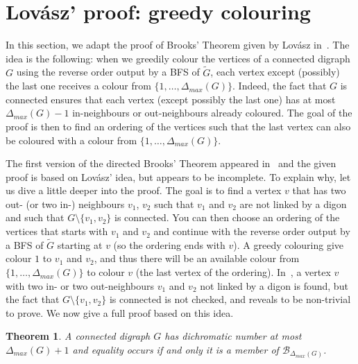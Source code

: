 \documentclass[11pt]{article}
\newtheorem{theorem}[lemma]{Theorem}
\newcommand{\mc}{\mathcal}
\newcommand{\sm}{\setminus}
\newcommand{\dmax}{\Delta_{max}}
\begin{document}



\section{Lov\'asz' proof: greedy colouring}\label{sec:lovasz}

In this section, we adapt the proof of Brooks' Theorem given by Lov\'asz in~\cite{L75}. 
The idea is the following: when we greedily colour the vertices of a connected digraph $G$ using the reverse order output by a BFS of $\tilde G$, each vertex except (possibly) the last one receives a colour from $\{1, \dots, \Delta_{max}(G)\}$. Indeed, the fact that $G$ is connected ensures that each vertex (except possibly the last one) has at most $\dmax(G) -1$ in-neighbours or out-neighbours already coloured. 
The goal of the proof is then to find an ordering of the vertices such that the last vertex can also be coloured with a colour from $\{1, \dots, \Delta_{max}(G)\}$. 

The first version of the directed Brooks' Theorem appeared in~\cite{M10} and the  given proof is based on Lov\'asz' idea, but appears to be incomplete.  
To explain why, let us dive a little deeper into the proof. 
The goal is to find a vertex $v$ that has two out- (or two in-) neighbours $v_1$, $v_2$ such that $v_1$ and $v_2$ are not linked by a digon and such that $G \sm \{v_1, v_2\}$ is connected. 
You can then choose an ordering of the vertices that starts with $v_1$ and $v_2$ and continue with the reverse order output by a BFS of $\tilde G$ starting at $v$ (so the ordering ends with $v$). A greedy colouring give colour $1$ to $v_1$ and $v_2$, and thus there will be an available colour from $\{1, \dots, \dmax(G)\}$ to colour $v$ (the last vertex of the ordering). 
In~\cite{M10}, a vertex $v$ with two in- or two out-neighbours $v_1$ and $v_2$ not linked by a digon is found, but the fact that $G \sm \{v_1, v_2\}$ is connected is not checked, and reveals to be non-trivial to prove.  
We now give a full proof based on this idea. 


\begin{theorem}
A connected digraph $G$ has dichromatic number at most $\dmax(G) +1$ and equality occurs if and only it is a member of $\mc B_{\dmax(G)}$. 
\end{theorem}
\end{document}
